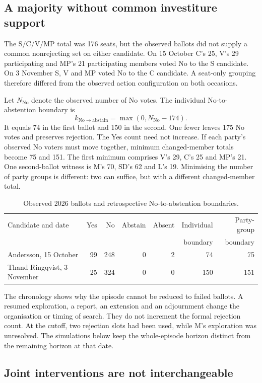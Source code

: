 \documentclass[11pt,a4paper]{article}
\newcommand{\No}{\mathrm{No}}
\begin{document}
\subsection{A majority without common investiture support}

The S/C/V/MP total was 176 seats, but the observed ballots did not supply a common nonrejecting set on either candidate. On 15 October C's 25, V's 29 participating and MP's 21 participating members voted No to the S candidate. On 3 November S, V and MP voted No to the C candidate. A seat-only grouping therefore differed from the observed action configuration on both occasions.

Let \(N_{\No}\) denote the observed number of No votes. The individual No-to-abstention boundary is
\[
k_{\No\to\mathrm{abstain}}=\max(0,N_{\No}-174).
\]
It equals 74 in the first ballot and 150 in the second. One fewer leaves 175 No votes and preserves rejection. The Yes count need not increase. If each party's observed No voters must move together, minimum changed-member totals become 75 and 151. The first minimum comprises V's 29, C's 25 and MP's 21. One second-ballot witness is M's 70, SD's 62 and L's 19. Minimising the number of party groups is different: two can suffice, but with a different changed-member total.

\begin{table}[tbp]\centering
\caption{Observed 2026 ballots and retrospective No-to-abstention boundaries.}\label{tab:observed}
\begin{tabularx}{\linewidth}{Xrrrrrr}\toprule
Candidate and date&Yes&No&Abstain&Absent&Individual&Party-group\\
&&&&&boundary&boundary\\\midrule
Andersson, 15 October&99&248&0&2&74&75\\
Thand Ringqvist, 3 November&25&324&0&0&150&151\\\bottomrule
\end{tabularx}
\end{table}

The chronology shows why the episode cannot be reduced to failed ballots. A resumed exploration, a report, an extension and an adjournment change the organisation or timing of search. They do not increment the formal rejection count. At the cutoff, two rejection slots had been used, while M's exploration was unresolved. The simulations below keep the whole-episode horizon distinct from the remaining horizon at that date.

\subsection{Joint interventions are not interchangeable}
\end{document}
